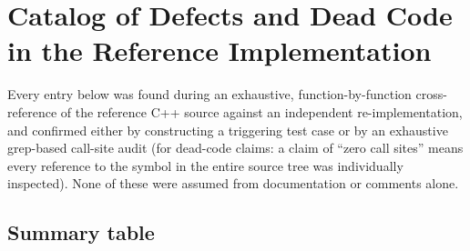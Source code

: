 \chapter{Catalog of Defects and Dead Code in the Reference Implementation}
\label{ch:defects}

Every entry below was found during an exhaustive, function-by-function cross-reference of the
reference C++ source against an independent re-implementation, and confirmed either by
constructing a triggering test case or by an exhaustive grep-based call-site audit (for
dead-code claims: a claim of ``zero call sites'' means every reference to the symbol in the
entire source tree was individually inspected). None of these were assumed from documentation or
comments alone.

\section{Summary table}

